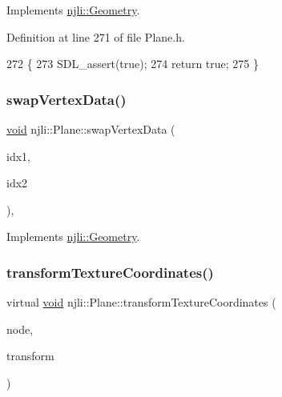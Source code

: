 Implements \mbox{\hyperlink{classnjli_1_1_geometry_a9d2e2064f925d9be17ed7fb1b84b728a}{njli\+::\+Geometry}}.



Definition at line 271 of file Plane.\+h.


\begin{DoxyCode}
272     \{
273       SDL\_assert(\textcolor{keyword}{true});
274       \textcolor{keywordflow}{return} \textcolor{keyword}{true};
275     \}
\end{DoxyCode}
\mbox{\label{classnjli_1_1_plane_a238e9b9a68bf90b6e7a90119fe852da7}} 
\subsubsection{\texorpdfstring{swap\+Vertex\+Data()}{swapVertexData()}}
{\footnotesize\ttfamily \mbox{\hyperlink{_thread_8h_af1e856da2e658414cb2456cb6f7ebc66}{void}} njli\+::\+Plane\+::swap\+Vertex\+Data (\begin{DoxyParamCaption}\item[{const size\+\_\+t}]{idx1,  }\item[{const size\+\_\+t}]{idx2 }\end{DoxyParamCaption})\hspace{0.3cm}{\ttfamily [protected]}, {\ttfamily [virtual]}}



Implements \mbox{\hyperlink{classnjli_1_1_geometry_ac7ee1093062d2f342519f7914852a367}{njli\+::\+Geometry}}.

\mbox{\label{classnjli_1_1_plane_a39afa45eb73d3c9a84d5a814d58ea963}} 
\subsubsection{\texorpdfstring{transform\+Texture\+Coordinates()}{transformTextureCoordinates()}}
{\footnotesize\ttfamily virtual \mbox{\hyperlink{_thread_8h_af1e856da2e658414cb2456cb6f7ebc66}{void}} njli\+::\+Plane\+::transform\+Texture\+Coordinates (\begin{DoxyParamCaption}\item[{\mbox{\hyperlink{classnjli_1_1_node}{Node}} $\ast$}]{node,  }\item[{const bt\+Transform \&}]{transform }\end{DoxyParamCaption})\hspace{0.3cm}{\ttfamily [virtual]}}

